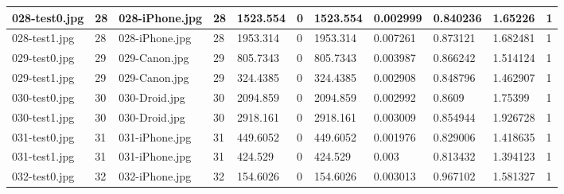 \begin{landscape}
\begin{longtable}{|p{2cm}|p{1cm}|p{2cm}|p{1cm}|p{2cm}|p{1cm}|p{2cm}|p{2cm}|p{2cm}|p{2cm}|p{1cm}|}
		028-test0.jpg   & 28               & 028-iPhone.jpg        & 28                          & 1523.554              & 0                       & 1523.554                   & 0.002999              & 0.840236              & 1.65226                  & 1                \\ \hline
		028-test1.jpg   & 28               & 028-iPhone.jpg        & 28                          & 1953.314              & 0                       & 1953.314                   & 0.007261              & 0.873121              & 1.682481                 & 1                \\ \hline
		029-test0.jpg   & 29               & 029-Canon.jpg         & 29                          & 805.7343              & 0                       & 805.7343                   & 0.003987              & 0.866242              & 1.514124                 & 1                \\ \hline
		029-test1.jpg   & 29               & 029-Canon.jpg         & 29                          & 324.4385              & 0                       & 324.4385                   & 0.002908              & 0.848796              & 1.462907                 & 1                \\ \hline
		030-test0.jpg   & 30               & 030-Droid.jpg         & 30                          & 2094.859              & 0                       & 2094.859                   & 0.002992              & 0.8609                & 1.75399                  & 1                \\ \hline
		030-test1.jpg   & 30               & 030-Droid.jpg         & 30                          & 2918.161              & 0                       & 2918.161                   & 0.003009              & 0.854944              & 1.926728                 & 1                \\ \hline
		031-test0.jpg   & 31               & 031-iPhone.jpg        & 31                          & 449.6052              & 0                       & 449.6052                   & 0.001976              & 0.829006              & 1.418635                 & 1                \\ \hline
		031-test1.jpg   & 31               & 031-iPhone.jpg        & 31                          & 424.529               & 0                       & 424.529                    & 0.003                 & 0.813432              & 1.394123                 & 1                \\ \hline
		032-test0.jpg   & 32               & 032-iPhone.jpg        & 32                          & 154.6026              & 0                       & 154.6026                   & 0.003013              & 0.967102              & 1.581327                 & 1                \\ \hline

\end{longtable}
\end{landscape}
